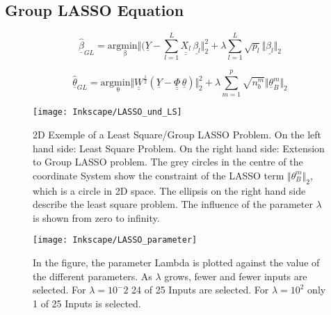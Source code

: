 \subsection{Group LASSO Equation}
\label{sec:GroupLassoEq}



 \begin{equation}
	\hat{\underline{\beta}}_{GL} = \mathrm{arg \underset{\beta} min} \Vert  (\underline{Y} - \sum_{l=1}^L \underline{\underline{X_l}} \, \underline{\beta_l} \Vert^2_2 + \lambda \sum_{l=1}^L \sqrt{p_l} \Vert \underline{\beta_l} \Vert_2
	\label{eq:grouplasso_original}
\end{equation}



 \begin{equation}
	\hat{\underline{\theta}}_{GL} = \mathrm{arg \underset{\theta} min} \Vert \underline{\underline{W}}^{\frac{1}{2}} (\underline{Y}-\underline{\underline{\Phi}} \, \underline{\theta}) \Vert^2_2 + \lambda \sum_{m=1}^p \sqrt{n^m_b} \Vert \underline{\theta}^m_B \Vert_2
	\label{eq:grouplasso}
\end{equation}

\begin{figure}[!htb]
    \centering
    \texttt{[image: Inkscape/LASSO\_und\_LS]} %
    \caption[2D Example Least Square vs. Gruop LASSO]{2D Exemple of a Least Square/Group LASSO Problem. On the left hand side: Least Square Problem. On the right hand side: Extension to Group LASSO problem. The grey circles in the centre of the coordinate System show the constraint of the LASSO term $\Vert \theta^m_B \Vert_2$, which is a circle in 2D space. The ellipsis on the right hand side describe the least square problem. The influence of the parameter $\lambda$ is shown from zero to infinity.}
    \label{fig:2D_LASSO}
\end{figure}

\begin{figure}[!htb]
    \centering
    \texttt{[image: Inkscape/LASSO\_parameter]} %
    \caption[Influence of the $\lambda$ parameter]{In the figure, the parameter Lambda is plotted against the value of the different parameters. As $\lambda$ grows, fewer and fewer inputs are selected. For $\lambda = 10^-2$ 24 of 25 Inputs are selected. For $\lambda = 10^2$ only 1 of 25 Inputs is selected.
}
    \label{fig:LASSO_parameter}
\end{figure}

